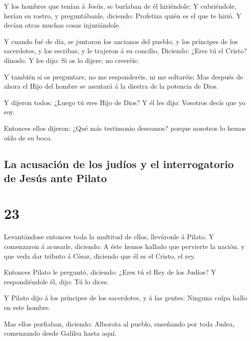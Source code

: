  Y los hombres que tenían á Jesús, se burlaban de él
hiriéndole;  Y cubriéndole, herían su rostro, y
preguntábanle, diciendo: Profetiza quién es el que te hirió.
 Y decían otras muchas cosas injuriándole.

 Y cuando fué de día, se juntaron los ancianos del
pueblo, y los príncipes de los sacerdotes, y los escribas, y le trajeron
á su concilio,  Diciendo: ¿Eres tú el Cristo? dínoslo. Y
les dijo: Si os lo dijere, no creeréis;

 Y también si os preguntare, no me responderéis, ni me
soltaréis:  Mas después de ahora el Hijo del hombre se
asentará á la diestra de la potencia de Dios.

 Y dijeron todos: ¿Luego tú eres Hijo de Dios? Y él les
dijo: Vosotros decís que yo soy.

 Entonces ellos dijeron: ¿Qué más testimonio deseamos?
porque nosotros lo hemos oído de su boca.

\hypertarget{la-acusaciuxf3n-de-los-juduxedos-y-el-interrogatorio-de-jesuxfas-ante-pilato}{%
\subsection{La acusación de los judíos y el interrogatorio de Jesús ante
Pilato}\label{la-acusaciuxf3n-de-los-juduxedos-y-el-interrogatorio-de-jesuxfas-ante-pilato}}

\hypertarget{section-22}{%
\section{23}\label{section-22}}

 Levantándose entonces toda la multitud de ellos,
lleváronle á Pilato.  Y comenzaron á acusarle, diciendo: A
éste hemos hallado que pervierte la nación, y que veda dar tributo á
César, diciendo que él es el Cristo, el rey.

 Entonces Pilato le preguntó, diciendo: ¿Eres tú el Rey de
los Judíos? Y respondiéndole él, dijo: Tú lo dices.

 Y Pilato dijo á los príncipes de los sacerdotes, y á las
gentes: Ninguna culpa hallo en este hombre.

 Mas ellos porfiaban, diciendo: Alborota al pueblo,
enseñando por toda Judea, comenzando desde Galilea hasta aquí.

